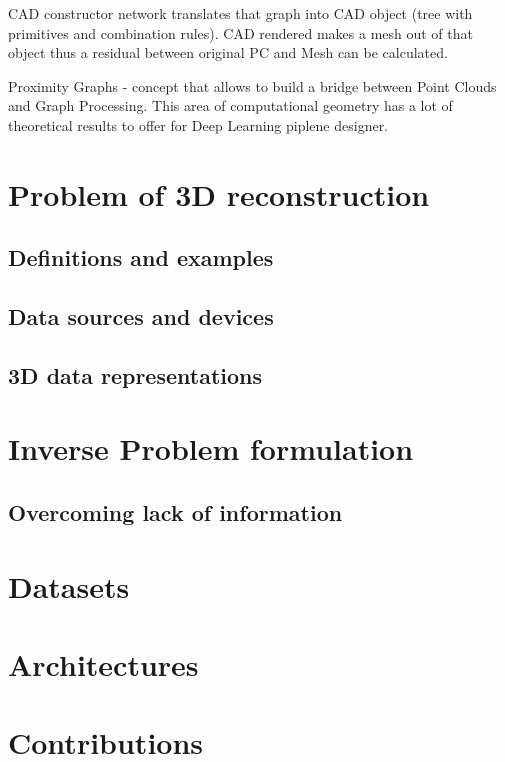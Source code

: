 CAD constructor network translates that graph into CAD object (tree with primitives and combination rules). CAD rendered makes a mesh out of that object thus a residual between original PC and Mesh can be calculated.

Proximity Graphs - concept that allows to build a bridge between Point Clouds and Graph Processing. This area of computational geometry has a lot of theoretical results to offer for Deep Learning piplene designer.


\section{Problem of 3D reconstruction}
\subsection{Definitions and examples}
\subsection{Data sources and devices}
\subsection{3D data representations}


\section{Inverse Problem formulation}
\subsection{Overcoming lack of information}

\section{Datasets}
\section{Architectures}
\section{Contributions}

 

